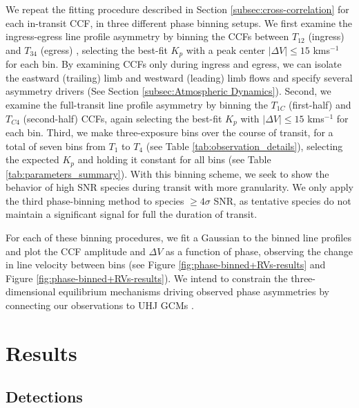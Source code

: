 \documentclass[twocolumn]{aastex631}
\begin{document}
            We repeat the fitting procedure described in Section \ref{subsec:cross-correlation} for each in-transit CCF, in three different phase binning setups. We first examine the ingress-egress line profile asymmetry by binning the CCFs between $T_{12}$ (ingress) and $T_{34}$ (egress) \citep{Lund2017}, selecting the best-fit $K_p$ with a peak center $|\Delta V| \leq 15$ kms$^{-1}$ for each bin. By examining CCFs only during ingress and egress, we can isolate the eastward (trailing) limb and westward (leading) limb flows and specify several asymmetry drivers (See Section \ref{subsec:Atmospheric Dynamics}). Second, we examine the full-transit line profile asymmetry by binning the $T_{1C}$ (first-half) and $T_{C4}$ (second-half) CCFs, again selecting the best-fit $K_p$ with $|\Delta V| \leq 15$ kms$^{-1}$ for each bin. Third, we make three-exposure bins over the course of transit, for a total of seven bins from $T_1$ to $T_4$ (see Table \ref{tab:observation_details}), selecting the expected $K_p$ and holding it constant for all bins (see Table \ref{tab:parameters_summary}). With this binning scheme, we seek to show the behavior of high SNR species during transit with more granularity. We only apply the third phase-binning method to species $\geq4\sigma$ SNR, as tentative species do not maintain a significant signal for full the duration of transit.
            
            For each of these binning procedures, we fit a Gaussian to the binned line profiles and plot the CCF amplitude and $\Delta V$ as a function of phase, observing the change in line velocity between bins (see Figure \ref{fig:phase-binned+RVs-results} and Figure \ref{fig:phase-binned+RVs-results}). We intend to constrain the three-dimensional equilibrium mechanisms driving observed phase asymmetries by connecting our observations to UHJ GCMs \citep{Savel2023}. 
            
            
            
    \section{Results}\label{sec:Results}

        
        \subsection{Detections}\label{subsec:Detections}
\end{document}
